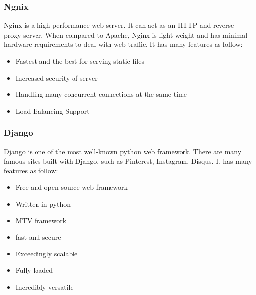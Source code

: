 \subsubsection{Ngnix}
Nginx is a high performance web server. It can act as an HTTP and reverse proxy server. When compared to Apache, Nginx is light-weight and has minimal hardware requirements to deal with web traffic. It has many features as follow:
\begin{itemize}
	\item Fastest and the best for serving static files
	\item Increased security of server 
	\item Handling many concurrent connections at the same time
	\item Load Balancing Support
\end{itemize}
\subsubsection{Django}
Django is one of the most well-known python web framework. There are many famous sites built with Django, such as Pinterest, Instagram, Disqus. It has many features as follow:
\begin{itemize}
	\item Free and open-source web framework
	\item Written in python
	\item MTV framework
	\item fast and secure
	\item Exceedingly scalable
	\item Fully loaded
	\item Incredibly versatile
\end{itemize}

